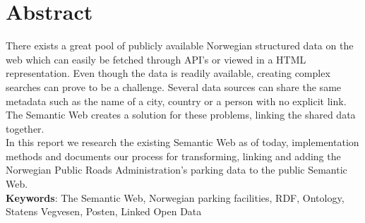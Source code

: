 \chapter*{Abstract}
There exists a great pool of publicly available Norwegian structured data on the web which can easily be fetched through API's or viewed in a HTML representation. Even though the data is readily available, creating complex searches can prove to be a challenge. Several data sources can share the same metadata such as the name of a city, country or a person with no explicit link. The Semantic Web creates a solution for these problems, linking the shared data together.\\

In this report we research the existing Semantic Web as of today, implementation methods and documents our process for transforming, linking and adding the Norwegian Public Roads Administration's parking data to the public Semantic Web.\\

\textbf{Keywords}: The Semantic Web, Norwegian parking facilities, RDF, Ontology, Statens Vegvesen, Posten, Linked Open Data
